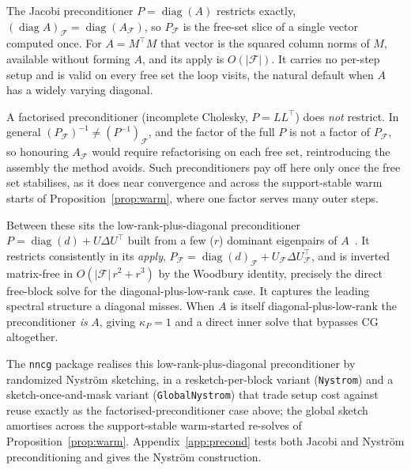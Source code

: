 The Jacobi preconditioner $P = \operatorname{diag}(A)$ restricts exactly,
$(\operatorname{diag} A)_{\mathcal{F}} = \operatorname{diag}(A_{\mathcal{F}})$, so
$P_{\mathcal{F}}$ is the free-set slice of a single vector computed once. For $A = M^\top M$
that vector is the squared column norms of $M$, available without forming $A$, and its apply
is $O(|\mathcal{F}|)$. It carries no per-step setup and is valid on every free set the loop
visits, the natural default when $A$ has a widely varying diagonal.

A factorised preconditioner (incomplete Cholesky, $P = LL^\top$) does \emph{not} restrict. In
general $(P_{\mathcal{F}})^{-1} \neq (P^{-1})_{\mathcal{F}}$, and the factor of the full $P$ is
not a factor of $P_{\mathcal{F}}$, so honouring $A_{\mathcal{F}}$ would require refactorising
on each free set, reintroducing the assembly the method avoids. Such preconditioners pay off
here only once the free set stabilises, as it does near convergence and across the
support-stable warm starts of Proposition~\ref{prop:warm}, where one factor serves many outer
steps.

Between these sits the low-rank-plus-diagonal preconditioner
$P = \operatorname{diag}(d) + U\Delta U^\top$ built from a few ($r$) dominant eigenpairs of
$A$~\cite{saad2003iterative}. It restricts consistently in its \emph{apply},
$P_{\mathcal{F}} = \operatorname{diag}(d)_{\mathcal{F}} + U_{\mathcal{F}}\Delta
U_{\mathcal{F}}^\top$, and is inverted matrix-free in $O(|\mathcal{F}|\,r^2 + r^3)$ by the
Woodbury identity, precisely the direct free-block solve for the diagonal-plus-low-rank case.
It captures the leading spectral structure a diagonal misses. When $A$ is itself
diagonal-plus-low-rank the preconditioner \emph{is} $A$, giving $\kappa_P = 1$ and a direct
inner solve that bypasses CG altogether.

The \texttt{nncg} package realises this low-rank-plus-diagonal preconditioner by randomized
Nyström sketching, in a resketch-per-block variant (\texttt{Nystrom}) and a
sketch-once-and-mask variant (\texttt{GlobalNystrom}) that trade setup cost against reuse
exactly as the factorised-preconditioner case above; the global sketch amortises across the
support-stable warm-started re-solves of Proposition~\ref{prop:warm}. Appendix~\ref{app:precond}
tests both Jacobi and Nyström preconditioning and gives the Nyström construction.

